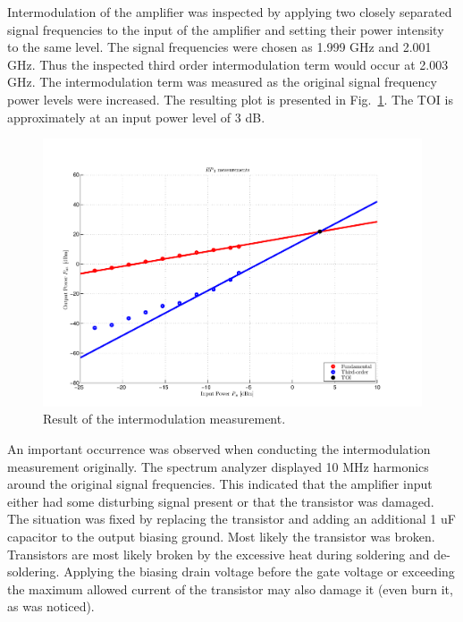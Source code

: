 \documentclass[a4paper, 12pt]{article}
\begin{document}
Intermodulation of the amplifier was inspected by applying two closely separated signal frequencies to the input of the amplifier and setting their power intensity to the same level. The signal frequencies were chosen as 1.999 GHz and 2.001 GHz. Thus the inspected third order intermodulation term would occur at 2.003 GHz. The intermodulation term was measured as the original signal frequency power levels were increased. The resulting plot is presented in Fig.~\ref{m:toi}. The TOI is approximately at an input power level of 3 dB.

\begin{figure}[!h]
	\begin{center}
	\includegraphics[width=5in]{data/Measurements/toi.pdf}
	\caption{Result of the intermodulation measurement.}
	\label{m:toi}
	\end{center}
\end{figure}

An important occurrence was observed when conducting the intermodulation measurement originally. The spectrum analyzer displayed 10 MHz harmonics around the original signal frequencies. This indicated that the amplifier input either had some disturbing signal present or that the transistor was damaged. The situation was fixed by replacing the transistor and adding an additional 1 uF capacitor to the output biasing ground. Most likely the transistor was broken. Transistors are most likely broken by the excessive heat during soldering and de-soldering. Applying the biasing drain voltage before the gate voltage or exceeding the maximum allowed current of the transistor may also damage it (even burn it, as was noticed).
\end{document}
